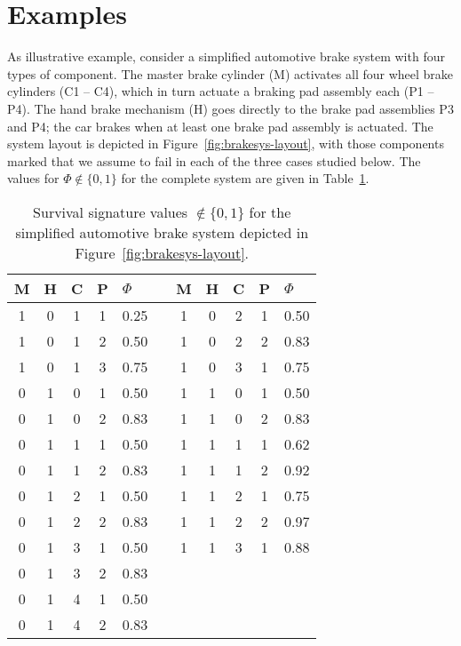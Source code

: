 \documentclass[Journal,letterpaper]{ascelike-new}
\begin{document}
\section{Examples}
\label{sec:examples}

As illustrative example, consider a simplified automotive brake system with four types of component.
The master brake cylinder (M) activates all four wheel brake cylinders (C1 -- C4),
which in turn actuate a braking pad assembly each (P1 -- P4).
The hand brake mechanism (H) goes directly to the brake pad assemblies P3 and P4;
the car brakes when at least one brake pad assembly is actuated.
The system layout is depicted in Figure~\ref{fig:brakesys-layout},
with those components marked that we assume to fail in each of the three cases studied below.
The values for $\Phi \not\in \{0,1\}$ for the complete system are given in Table~\ref{tab:brake-survsign}.

\begin{table}
\caption{Survival signature values $\not\in \{0,1\}$ for the simplified automotive brake system depicted in Figure~\ref{fig:brakesys-layout}.}
\label{tab:brake-survsign}
\centering
\begin{tabular}{cccclcccccl}
  \toprule
M & H & C & P & $\Phi$ & \quad & M & H & C & P & $\Phi$\\ 
  \midrule
1 & 0 & 1 & 1 & 0.25 & & 1 & 0 & 2 & 1 & 0.50 \\ 
1 & 0 & 1 & 2 & 0.50 & & 1 & 0 & 2 & 2 & 0.83 \\ 
1 & 0 & 1 & 3 & 0.75 & & 1 & 0 & 3 & 1 & 0.75 \\ 
0 & 1 & 0 & 1 & 0.50 & & 1 & 1 & 0 & 1 & 0.50 \\ 
0 & 1 & 0 & 2 & 0.83 & & 1 & 1 & 0 & 2 & 0.83 \\ 
0 & 1 & 1 & 1 & 0.50 & & 1 & 1 & 1 & 1 & 0.62 \\ 
0 & 1 & 1 & 2 & 0.83 & & 1 & 1 & 1 & 2 & 0.92 \\ 
0 & 1 & 2 & 1 & 0.50 & & 1 & 1 & 2 & 1 & 0.75 \\ 
0 & 1 & 2 & 2 & 0.83 & & 1 & 1 & 2 & 2 & 0.97 \\ 
0 & 1 & 3 & 1 & 0.50 & & 1 & 1 & 3 & 1 & 0.88 \\ 
0 & 1 & 3 & 2 & 0.83 \\
0 & 1 & 4 & 1 & 0.50 \\
0 & 1 & 4 & 2 & 0.83 \\
   \bottomrule
\end{tabular}
\end{table}
\end{document}
